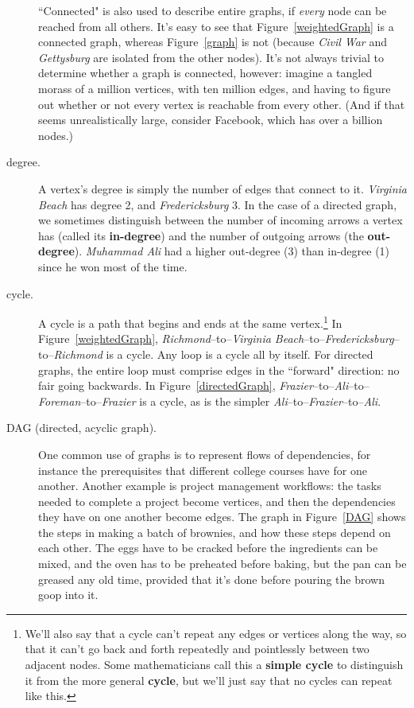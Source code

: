 \begin{description}
``Connected" is also used to describe entire graphs, if \textit{every}
node can be reached from all others. It's easy to see that
Figure~\ref{weightedGraph} is a connected graph, whereas Figure~\ref{graph}
is not (because \textsl{Civil War} and \textsl{Gettysburg} are isolated
from the other nodes). It's not always trivial to determine whether a graph
is connected, however: imagine a tangled morass of a million vertices, with
ten million edges, and having to figure out whether or not every vertex is
reachable from every other. (And if that seems unrealistically large,
consider Facebook, which has over a billion nodes.)

\item[degree.] A vertex's degree is simply the number of edges that connect
to it. \textsl{Virginia Beach} has degree 2, and \textsl{Fredericksburg} 3.
In the case of a directed graph, we sometimes distinguish between the
number of incoming arrows a vertex has (called its \textbf{in-degree}) and
the number of outgoing arrows (the \textbf{out-degree}). \textsl{Muhammad
Ali} had a higher out-degree (3) than in-degree (1) since he won most of
the time.

\item[cycle.] A cycle is a path that begins and ends at the same
vertex.\footnote{We'll also say that a cycle can't repeat any edges or
vertices along the way, so that it can't go back and forth repeatedly and
pointlessly between two adjacent nodes. Some mathematicians call this a
\textbf{simple cycle} to distinguish it from the more general
\textbf{cycle}, but we'll just say that no cycles can repeat like this.} In
Figure~\ref{weightedGraph}, \textsl{Richmond}--to--\textsl{Virginia
Beach}--to--\textsl{Fredericksburg}--to--\textsl{Richmond} is a cycle.  Any
loop is a cycle all by itself. For directed graphs, the entire loop must
comprise edges in the ``forward" direction: no fair going backwards. In
Figure~\ref{directedGraph},
\textsl{Frazier}--to--\textsl{Ali}--to--\textsl{Foreman}--to--\textsl{Frazier}
is a cycle, as is the simpler
\textsl{Ali}--to--\textsl{Frazier}--to--\textsl{Ali}.

\item[DAG (directed, acyclic graph).] One common use of graphs is to
represent flows of dependencies, for instance the prerequisites that
different college courses have for one another. Another example is project
management workflows: the tasks needed to complete a project become
vertices, and then the dependencies they have on one another become edges.
The graph in Figure~\ref{DAG} shows the steps in making a batch of
brownies, and how these steps depend on each other. The eggs have to be
cracked before the ingredients can be mixed, and the oven has to be
preheated before baking, but the pan can be greased any old time, provided
that it's done before pouring the brown goop into it.


\end{description}
